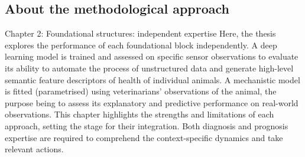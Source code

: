







 

\subsection{About the methodological approach}
 
Chapter 2: Foundational structures: independent expertise
Here, the thesis explores the performance of each foundational block independently. A deep learning model is trained and assessed on specific sensor observations to evaluate its ability to automate the process of unstructured data and generate high-level semantic feature descriptors of health of individual animals. A mechanistic model is fitted (parametrised) using veterinarians' observations of the animal, the purpose being to assess its explanatory and predictive performance on real-world observations. This chapter highlights the strengths and limitations of each approach, setting the stage for their integration. Both diagnosis and prognosis expertise are required to comprehend the context-specific dynamics and take relevant actions. 

